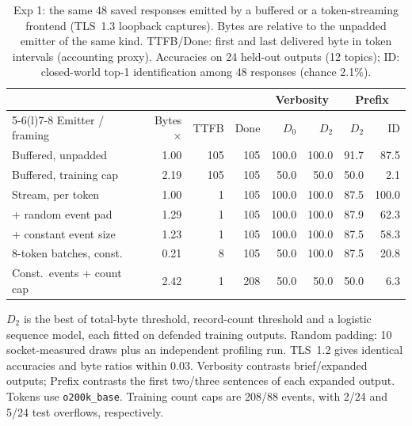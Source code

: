 \begin{table}[t]\centering\footnotesize\setlength{\tabcolsep}{1.9pt}
\caption{Exp 1: the same 48 saved responses emitted by a buffered or a token-streaming frontend (TLS~1.3 loopback captures). Bytes are relative to the unpadded emitter of the same kind. TTFB/Done: first and last delivered byte in token intervals (accounting proxy). Accuracies on 24 held-out outputs (12 topics); ID: closed-world top-1 identification among 48 responses (chance 2.1\%).}\label{tab:transfer-streaming}
\begin{tabular}{@{}lrrrrrrr@{}}\toprule
& & & & \multicolumn{2}{c}{Verbosity} & \multicolumn{2}{c}{Prefix}\\\cmidrule(lr){5-6}\cmidrule(l){7-8}
Emitter / framing & Bytes$\times$ & TTFB & Done & $D_0$ & $D_2$ & $D_2$ & ID\\\midrule
Buffered, unpadded & 1.00 & 105 & 105 & 100.0 & 100.0 & 91.7 & 87.5\\
Buffered, training cap & 2.19 & 105 & 105 & 50.0 & 50.0 & 50.0 & 2.1\\
Stream, per token & 1.00 & 1 & 105 & 100.0 & 100.0 & 87.5 & 100.0\\
\quad+ random event pad & 1.29 & 1 & 105 & 100.0 & 100.0 & 87.9 & 62.3\\
\quad+ constant event size & 1.23 & 1 & 105 & 100.0 & 100.0 & 87.5 & 58.3\\
8-token batches, const. & 0.21 & 8 & 105 & 50.0 & 100.0 & 87.5 & 20.8\\
Const.\ events + count cap & 2.42 & 1 & 208 & 50.0 & 50.0 & 50.0 & 6.3\\\bottomrule
\end{tabular}
\par\smallskip\raggedright\footnotesize $D_2$ is the best of total-byte threshold, record-count threshold and a logistic sequence model, each fitted on defended training outputs. Random padding: 10 socket-measured draws plus an independent profiling run. TLS~1.2 gives identical accuracies and byte ratios within 0.03. Verbosity contrasts brief/expanded outputs; Prefix contrasts the first two/three sentences of each expanded output. Tokens use \texttt{o200k\_base}. Training count caps are 208/88 events, with 2/24 and 5/24 test overflows, respectively.
\end{table}
